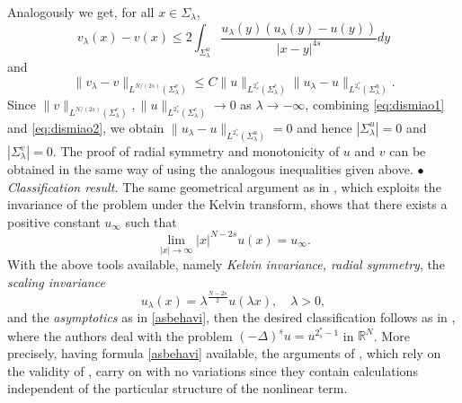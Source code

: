 \documentclass[10pt]{amsart}
\numberwithin{equation}{section}
\begin{document}
Analogously we get, for all $x\in\Sigma_\lambda$,
\[
v_\lambda(x) - v(x)
\leq
2 \int_{\Sigma_\lambda^u} \frac{u_\lambda(y)(u_\lambda(y)-u(y))}{|x-y|^{4s}}dy
\]
and
\begin{equation}
\label{eq:dismiao2}
\|v_\lambda - v\|_{L^{N/(2s)}(\Sigma_\lambda^v)}
\leq 
C \| u\|_{L^{2^*_s}(\Sigma_\lambda^c)} \| u_\lambda - u\|_{L^{2^*_s}(\Sigma_\lambda^u)}.
\end{equation}
Since $\|v\|_{L^{N/(2s)}(\Sigma_\lambda^c)},\| u\|_{L^{2^*_s}(\Sigma_\lambda^c)}\to 0$ as $\lambda\to-\infty$, combining \eqref{eq:dismiao1} and \eqref{eq:dismiao2},
we obtain $\|u_\lambda - u\|_{L^{2^*_s}(\Sigma_\lambda^u)}=0$ and hence
$|\Sigma_\lambda^u|=0$ and $|\Sigma_\lambda^v|=0$.
The proof of radial symmetry and monotonicity of $u$ and $v$ can be obtained in the same way of \cite[Step 2 and Step 3]{Ingoroneta} using the analogous inequalities given above.
\vskip3pt
\noindent
$\bullet$ {\em Classification result.}
The same geometrical argument as in \cite[proof of Step 3, p.335]{classif}, 
which exploits the invariance of the problem under the Kelvin transform,
shows that there exists a positive constant $u_\infty$ such that
\begin{equation}
\label{asbehavi}
\lim_{|x|\to\infty} |x|^{N-2s}u(x)=u_\infty.
\end{equation}
With the above tools available, namely {\em Kelvin invariance, radial symmetry}, the {\em scaling invariance} 
$$
u_\lambda(x)=\lambda^{\frac{N-2s}{2}}u(\lambda x),\quad \lambda>0,
$$
and the {\em asymptotics} as in \eqref{asbehavi}, then the desired
classification follows as in \cite[Section 3.1]{classif}, where the authors deal with the problem 
$(-\Delta)^su=u^{2^*_s-1}$ in ${{\mathbb R}}^N$. More precisely, having formula \eqref{asbehavi} available, 
the arguments of \cite[Section 3.1]{classif}, which rely on the validity of \cite[Lemma 3.1 and 3.2]{classif}, carry on 
with no variations since they contain calculations independent of the particular structure of the nonlinear term.

\bigskip
\bigskip 
\end{document}

